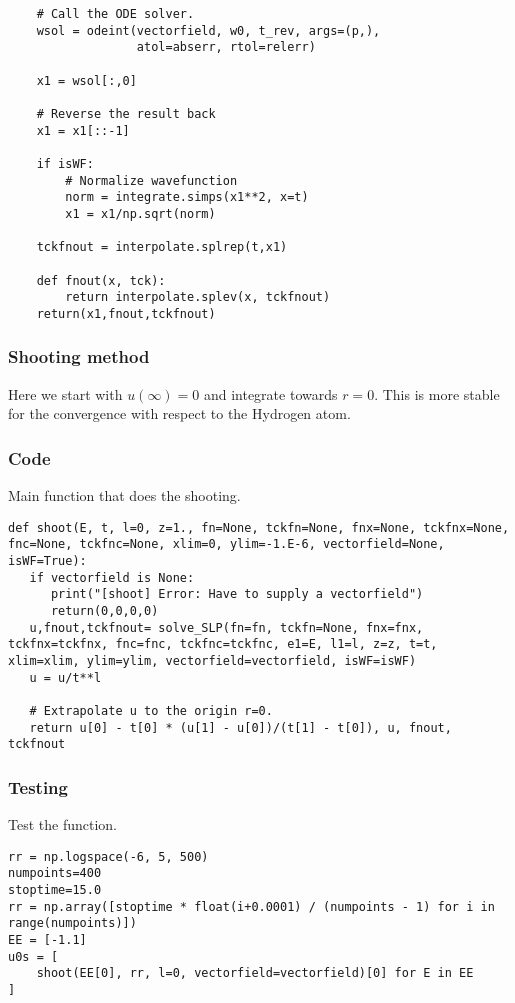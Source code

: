 \documentclass[11pt,a4paper]{article}
\begin{document}
\begin{enumerate}
\begin{verbatim}
    # Call the ODE solver.
    wsol = odeint(vectorfield, w0, t_rev, args=(p,),
                  atol=abserr, rtol=relerr)

    x1 = wsol[:,0]

    # Reverse the result back
    x1 = x1[::-1]

    if isWF:
        # Normalize wavefunction
        norm = integrate.simps(x1**2, x=t)
        x1 = x1/np.sqrt(norm)

    tckfnout = interpolate.splrep(t,x1)

    def fnout(x, tck):
        return interpolate.splev(x, tckfnout)
    return(x1,fnout,tckfnout)
\end{verbatim}
\end{enumerate}

\subsubsection{Shooting method}
\label{sec:org66536a7}

Here we start with \(u(\infty)=0\) and integrate towards
\(r=0\). This is more stable for the convergence with
respect to the Hydrogen atom.

\subsubsection{Code}
\label{sec:org26eb34b}
Main function that does the shooting.
\begin{verbatim}
def shoot(E, t, l=0, z=1., fn=None, tckfn=None, fnx=None, tckfnx=None, fnc=None, tckfnc=None, xlim=0, ylim=-1.E-6, vectorfield=None, isWF=True):
   if vectorfield is None:
      print("[shoot] Error: Have to supply a vectorfield")
      return(0,0,0,0)
   u,fnout,tckfnout= solve_SLP(fn=fn, tckfn=None, fnx=fnx, tckfnx=tckfnx, fnc=fnc, tckfnc=tckfnc, e1=E, l1=l, z=z, t=t, xlim=xlim, ylim=ylim, vectorfield=vectorfield, isWF=isWF)
   u = u/t**l

   # Extrapolate u to the origin r=0.
   return u[0] - t[0] * (u[1] - u[0])/(t[1] - t[0]), u, fnout, tckfnout
\end{verbatim}

\subsubsection{Testing}
\label{sec:org24ea0f6}
Test the function.
\begin{verbatim}
rr = np.logspace(-6, 5, 500)
numpoints=400
stoptime=15.0
rr = np.array([stoptime * float(i+0.0001) / (numpoints - 1) for i in range(numpoints)])
EE = [-1.1]
u0s = [
    shoot(EE[0], rr, l=0, vectorfield=vectorfield)[0] for E in EE
]

\end{verbatim}
\end{document}
